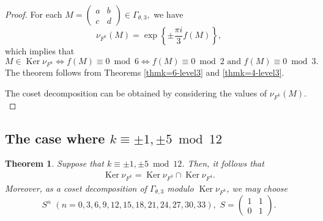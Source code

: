 \documentclass[12pt]{article}
\theoremstyle{definition}
\newtheorem{theorem}{Theorem}
\numberwithin{equation}{section}
\numberwithin{theorem}{section}
\newcommand{\Ker}{\operatorname{Ker}}
\begin{document}
\begin{proof}
For each 
$
M
=
\begin{pmatrix}
a & b \\
c & d
\end{pmatrix}
\in
\Gamma_{\theta,3}, 
$ 
we have 
\begin{equation*}
\nu_{F^{k}  }(M)=
\exp
\left\{
\pm
\frac{
 \pi i
}
{3} 
f(M) 
\right\},
\end{equation*}
which implies that 
\begin{equation*}
M
\in
\Ker \nu_{F^{k}}
\Longleftrightarrow 
f(M)\equiv 0 \bmod{6}
\Longleftrightarrow 
f(M)\equiv 0 \bmod{2} \,\,
\mathrm{and} \,\,
f(M)\equiv 0 \bmod{3}. 
\end{equation*}
The theorem follows from Theorems \ref{thmk=6-level3} and \ref{thmk=4-level3}.
\par
The coset decomposition can be obtained by considering the values of $\nu_{F^{k}  }(M).$
\end{proof}

















\subsection{The case where $k\equiv \pm 1, \pm 5 \bmod{12}$}



\begin{theorem}
\label{thmk=1and5}
{\it
Suppose that 
$k\equiv \pm1, \pm 5 \bmod{12}$. 
Then, it follows that 
\begin{align*}
\Ker \nu_{F^{k}}
=
\Ker 
\nu_{ F^{3} }
\cap
\Ker \nu_{ F^4 }. 
\end{align*}
Moreover, 
as a coset decomposition of $\Gamma_{\theta,3}$ modulo $\Ker \nu_{F^{k}}$,  
we may choose 
\begin{equation*}
S^{n}  \,\, 
(n=0,3,6,9,12,15,18,21,24,27,30,33),  \,\,
S=
\begin{pmatrix}
1 & 1 \\
0 & 1
\end{pmatrix}. 
\end{equation*}
}
\end{theorem}
\end{document}
